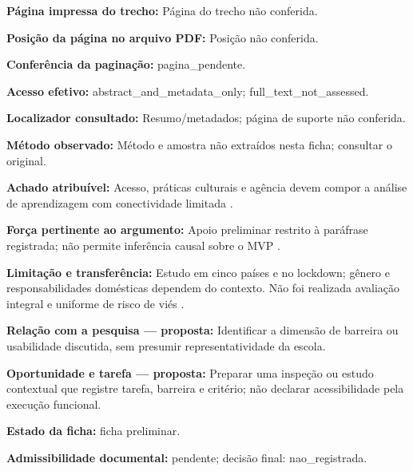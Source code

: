 \noindent\textbf{Página impressa do trecho:} Página do trecho não conferida.\par\medskip

\noindent\textbf{Posição da página no arquivo PDF:} Posição não conferida.\par\medskip

\noindent\textbf{Conferência da paginação:} pagina\_pendente.\par\medskip

\noindent\textbf{Acesso efetivo:} abstract\_and\_metadata\_only; full\_text\_not\_assessed.\par\medskip

\noindent\textbf{Localizador consultado:} Resumo/metadados; página de suporte não conferida.\par\medskip

\noindent\textbf{Método observado:} Método e amostra não extraídos nesta ficha; consultar o original.\par\medskip

\noindent\textbf{Achado atribuível:} Acesso, práticas culturais e agência devem compor a análise de aprendizagem com conectividade limitada \citep{mathrani2021}.\par\medskip

\noindent\textbf{Força pertinente ao argumento:} Apoio preliminar restrito à paráfrase registrada; não permite inferência causal sobre o MVP \citep{mathrani2021}.\par\medskip

\noindent\textbf{Limitação e transferência:} Estudo em cinco países e no lockdown; gênero e responsabilidades domésticas dependem do contexto. Não foi realizada avaliação integral e uniforme de risco de viés \citep{mathrani2021}.\par\medskip

\noindent\textbf{Relação com a pesquisa — proposta:} Identificar a dimensão de barreira ou usabilidade discutida, sem presumir representatividade da escola.\par\medskip

\noindent\textbf{Oportunidade e tarefa — proposta:} Preparar uma inspeção ou estudo contextual que registre tarefa, barreira e critério; não declarar acessibilidade pela execução funcional.\par\medskip

\noindent\textbf{Estado da ficha:} ficha preliminar.\par\medskip

\noindent\textbf{Admissibilidade documental:} pendente; decisão final: nao\_registrada.\par\medskip

